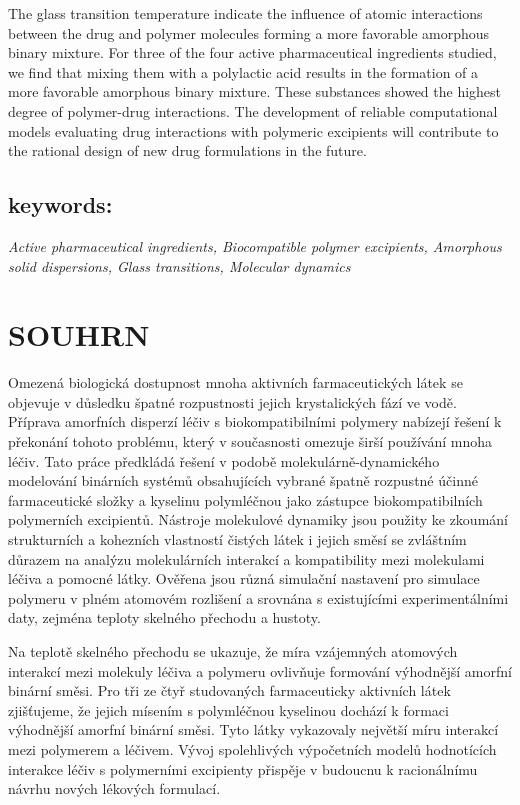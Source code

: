The glass transition temperature indicate the influence of atomic interactions between the drug and polymer molecules forming a more favorable amorphous binary mixture. For three of the four active pharmaceutical ingredients studied, we find that mixing them with a polylactic acid results in the formation of a more favorable amorphous binary mixture. These substances showed the highest degree of polymer-drug interactions. The development of reliable computational models evaluating drug interactions with polymeric excipients will contribute to the rational design of new drug formulations in the future.


\subsection*{keywords:}
\textit{Active pharmaceutical ingredients, Biocompatible polymer excipients, Amorphous solid dispersions, Glass transitions, Molecular dynamics}

\newpage
\section*{SOUHRN}
Omezená biologická dostupnost mnoha aktivních farmaceutických látek se objevuje v důsledku špatné rozpustnosti jejich krystalických fází ve vodě. Příprava amorfních disperzí léčiv s biokompatibilními polymery nabízejí řešení k překonání tohoto problému, který v současnosti omezuje širší používání mnoha léčiv. Tato práce předkládá řešení v podobě molekulárně-dynamického modelování binárních systémů obsahujících vybrané špatně rozpustné účinné farmaceutické složky a kyselinu polymléčnou jako zástupce biokompatibilních polymerních excipientů. Nástroje molekulové dynamiky jsou použity ke zkoumání strukturních a kohezních vlastností čistých látek i jejich směsí se zvláštním důrazem na analýzu molekulárních interakcí a kompatibility mezi molekulami léčiva a pomocné látky. Ověřena jsou různá simulační nastavení pro simulace polymeru v plném atomovém rozlišení a srovnána s existujícími experimentálními daty, zejména teploty skelného přechodu a hustoty.

Na teplotě skelného přechodu se ukazuje, že míra vzájemných atomových interakcí mezi molekuly léčiva a polymeru ovlivňuje formování výhodnější amorfní binární směsi. Pro tři ze čtyř studovaných farmaceuticky aktivních látek zjišťujeme, že jejich mísením s polymléčnou kyselinou dochází k formaci výhodnější amorfní binární směsi. Tyto látky vykazovaly největší míru interakcí mezi polymerem a léčivem. Vývoj spolehlivých výpočetních modelů hodnotících interakce léčiv s polymerními excipienty přispěje v budoucnu k racionálnímu návrhu nových lékových formulací.


